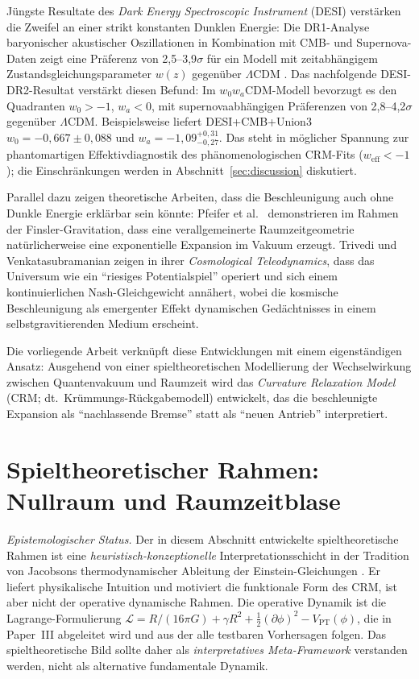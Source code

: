 \documentclass[aps,prd,twocolumn,superscriptaddress,nofootinbib]{revtex4-2}
\begin{document}
Jüngste Resultate des \textit{Dark Energy Spectroscopic Instrument} (DESI) verstärken die Zweifel an einer strikt konstanten Dunklen Energie: Die DR1-Analyse baryonischer akustischer Oszillationen in Kombination mit CMB- und Supernova-Daten zeigt eine Präferenz von 2,5--3,9$\sigma$ für ein Modell mit zeitabhängigem Zustandsgleichungsparameter $w(z)$ gegenüber $\Lambda$CDM \cite{DESI2024}. Das nachfolgende DESI-DR2-Resultat \cite{DESI2025} verstärkt diesen Befund: Im $w_0w_a$CDM-Modell bevorzugt es den Quadranten $w_0>-1$, $w_a<0$, mit supernovaabhängigen Präferenzen von 2,8--4,2$\sigma$ gegenüber $\Lambda$CDM. Beispielsweise liefert DESI+CMB+Union3 $w_0=-0{,}667\pm0{,}088$ und $w_a=-1{,}09^{+0{,}31}_{-0{,}27}$. Das steht in möglicher Spannung zur phantomartigen Effektivdiagnostik des phänomenologischen CRM-Fits ($w_\mathrm{eff}< -1$); die Einschränkungen werden in Abschnitt~\ref{sec:discussion} diskutiert.

Parallel dazu zeigen theoretische Arbeiten, dass die Beschleunigung auch ohne Dunkle Energie erklärbar sein könnte: Pfeifer et al.\ \cite{Pfeifer2025} demonstrieren im Rahmen der Finsler-Gravitation, dass eine verallgemeinerte Raumzeitgeometrie natürlicherweise eine exponentielle Expansion im Vakuum erzeugt. Trivedi und Venkatasubramanian \cite{Trivedi2025} zeigen in ihrer \textit{Cosmological Teleodynamics}, dass das Universum wie ein ``riesiges Potentialspiel'' operiert und sich einem kontinuierlichen Nash-Gleichgewicht annähert, wobei die kosmische Beschleunigung als emergenter Effekt dynamischen Gedächtnisses in einem selbstgravitierenden Medium erscheint.

Die vorliegende Arbeit verknüpft diese Entwicklungen mit einem eigenständigen Ansatz: Ausgehend von einer spieltheoretischen Modellierung der Wechselwirkung zwischen Quantenvakuum und Raumzeit wird das \textit{Curvature Relaxation Model} (CRM; dt.\ Krümmungs-Rückgabemodell) entwickelt, das die beschleunigte Expansion als ``nachlassende Bremse'' statt als ``neuen Antrieb'' interpretiert.

\section{Spieltheoretischer Rahmen: Nullraum und Raumzeitblase}
\label{sec:gametheory}

\textit{Epistemologischer Status.} Der in diesem Abschnitt entwickelte spieltheoretische Rahmen ist eine \emph{heuristisch-konzeptionelle} Interpretationsschicht in der Tradition von Jacobsons thermodynamischer Ableitung der Einstein-Gleichungen \cite{Jacobson1995}. Er liefert physikalische Intuition und motiviert die funktionale Form des CRM, ist aber nicht der operative dynamische Rahmen. Die operative Dynamik ist die Lagrange-Formulierung $\mathcal{L} = R/(16\pi G) + \gamma R^2 + \frac{1}{2}(\partial\phi)^2 - V_{\mathrm{PT}}(\phi)$, die in Paper~III \cite{Geiger2026c} abgeleitet wird und aus der alle testbaren Vorhersagen folgen. Das spieltheoretische Bild sollte daher als \emph{interpretatives Meta-Framework} verstanden werden, nicht als alternative fundamentale Dynamik.
\end{document}
